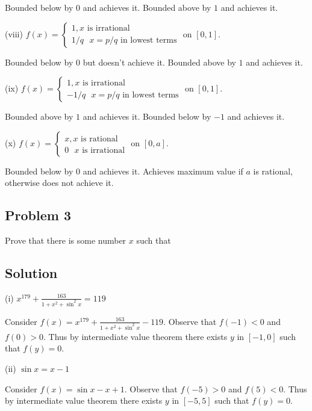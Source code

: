 Bounded below by $0$ and achieves it. Bounded above by $1$ and
achieves it.

\vs

(viii) $f(x)=\begin{cases}
  1, \text{$x$ is irrational}\\
  1/q \ \ \ x=p/q \text{ in lowest terms}
\end{cases}$ on $[0, 1]$.

Bounded below by $0$ but doesn't achieve it. Bounded above by $1$ and
achieves it.

\vs

(ix) $f(x)=\begin{cases}
  1, \text{$x$ is irrational}\\
  -1/q \ \ \ x=p/q \text{ in lowest terms}
\end{cases}$ on $[0, 1]$.

Bounded above by $1$ and achieves it. Bounded below by $-1$ and
achieves it.

\vs

(x) $f(x)=\begin{cases}
  x, \text{$x$ is rational}\\
  0 \ \ \ \text{$x$ is irrational}
\end{cases}$ on $[0, a]$.

Bounded below by $0$ and achieves it. Achieves maximum value if $a$ is
rational, otherwise does not achieve it.


\subsection*{Problem 3}
Prove that there is some number $x$ such that

\subsection*{Solution}
(i) $x^{179}+\frac{163}{1+x^{2}+\sin^{2} x}=119$

\vs

Consider $f(x)=x^{179}+\frac{163}{1+x^{2}+\sin^{2} x}-119$. Observe
that $f(-1)<0$ and $f(0)>0$. Thus by intermediate value theorem there
exists $y$ in $[-1,0]$ such that $f(y)=0$.

\vs

(ii) $\sin x = x-1$

\vs

Consider $f(x)=\sin x-x+1$. Observe that $f(-5)>0$ and $f(5)<0$. Thus
by intermediate value theorem there exists $y$ in $[-5,5]$ such that
$f(y)=0$.

